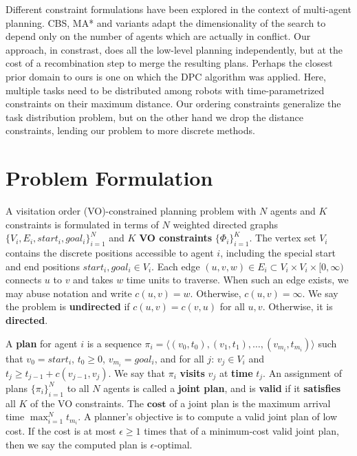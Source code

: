 \documentclass[letterpaper]{article}
\begin{document}
Different constraint formulations have been explored in the context of multi-agent planning. CBS, MA* and variants \cite{ferner2013odrm}\cite{sharon2015conflict}  adapt the dimensionality of the search to depend only on the number of agents which are actually in conflict. Our approach, in constrast, does all the low-level planning independently, but at the cost of a recombination step to merge the resulting plans. Perhaps the closest prior domain to ours is one on which the DPC algorithm \cite{bhattacharya2010multi} was applied. Here, multiple tasks need to be distributed among robots with time-parametrized constraints on their maximum distance. Our ordering constraints generalize the task distribution problem, but on the other hand we drop the distance constraints, lending our problem to more discrete methods.

\section{Problem Formulation}

A visitation order (VO)-constrained planning problem with $N$ agents and $K$ constraints is formulated in terms of $N$ weighted directed graphs $\{V_i,E_i,start_i,goal_i\}_{i=1}^N$ and $K$ \textbf{VO constraints} $\{\Phi_i\}_{i=1}^K$. The vertex set $V_i$ contains the discrete positions accessible to agent $i$, including the special start and end positions $start_i,goal_i\in V_i$. Each edge $(u,v,w)\in E_i \subset V_i\times V_i\times [0,\infty)$ connects $u$ to $v$ and takes $w$ time units to traverse. When such an edge exists, we may abuse notation and write $c(u,v) = w$. Otherwise, $c(u,v) = \infty$. We say the problem is \textbf{undirected} if $c(u,v) = c(v,u)$ for all $u,v$. Otherwise, it is \textbf{directed}.

A \textbf{plan} for agent $i$ is a sequence $\pi_i = \langle (v_0,t_0),(v_1,t_1),\ldots,(v_{m_i},t_{m_i}) \rangle$ such that $v_0 = start_i$, $t_0 \ge 0$, $v_{m_i} = goal_i$, and for all $j$: $v_j \in V_i$ and $t_{j} \ge t_{j-1} + c(v_{j-1},v_j)$. We say that $\pi_i$ \textbf{visits} $v_j$ at \textbf{time} $t_j$. An assignment of plans $\{\pi_i\}_{i=1}^N$ to all $N$ agents is called a \textbf{joint plan}, and is \textbf{valid} if it \textbf{satisfies} all $K$ of the VO constraints. The $\textbf{cost}$ of a joint plan is the maximum arrival time $\max_{i=1}^N t_{m_i}$. A planner's objective is to compute a valid joint plan of low cost. If the cost is at most $\epsilon \ge 1$ times that of a minimum-cost valid joint plan, then we say the computed plan is $\epsilon$-optimal.
\end{document}
